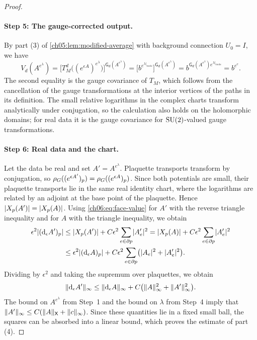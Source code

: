 \begin{proof}
\paragraph{Step 5: The gauge-corrected output.}
By part (3) of \cref{ch05:lem:modified-average} with background connection $U_0=I$, we have
\[
 V_d(A^{e^\lambda})=\bigl[T_M^d\bigl((e^{\epsilon A})^{e^\lambda}\bigr)\bigr]^{\mathsf G_d(A^{e^\lambda})}=\bigl[b^{e^{\lambda|_{\mathrm{roots}}}}\bigr]^{\mathsf G_d(A^{e^\lambda})}=b^{\mathsf G_d(A^{e^\lambda})e^{\lambda|_{\mathrm{roots}}}}=b^{e^c}.
\]
The second equality is the gauge covariance of $T_M$, which follows from the cancellation of the gauge transformations at the interior vertices of the paths in its definition. The small relative logarithms in the complex charts transform analytically under conjugation, so the calculation also holds on the holomorphic domains; for real data it is the gauge covariance for $\mathrm{SU}(2)$-valued gauge transformations.

\paragraph{Step 6: Real data and the chart.}
Let the data be real and set $A'=A^{e^\lambda}$. Plaquette transports transform by conjugation, so $\rho_G((e^{\epsilon A'})_p)=\rho_G((e^{\epsilon A})_p)$. Since both potentials are small, their plaquette transports lie in the same real identity chart, where the logarithms are related by an adjoint at the base point of the plaquette. Hence $\lvert X_p(A')\rvert=\lvert X_p(A)\rvert$. Using \eqref{ch06:eq:face-value} for $A'$ with the reverse triangle inequality and for $A$ with the triangle inequality, we obtain
\begin{equation}\label{ch06:eq:gauge-curl-comparison}
 \begin{split}
 \epsilon^2\lvert (\mathrm d_\epsilon A')_p\rvert&\le\lvert X_p(A')\rvert+C\epsilon^2\sum_{e\in\partial p}\lvert A'_e\rvert^2=\lvert X_p(A)\rvert+C\epsilon^2\sum_{e\in\partial p}\lvert A'_e\rvert^2\\
 &\le\epsilon^2\lvert (\mathrm d_\epsilon A)_p\rvert+C\epsilon^2\sum_{e\in\partial p}\bigl(\lvert A_e\rvert^2+\lvert A'_e\rvert^2\bigr).
 \end{split}
\end{equation}
Dividing by $\epsilon^2$ and taking the supremum over plaquettes, we obtain
\[
 \lVert \mathrm d_\epsilon A'\rVert_\infty\le\lVert \mathrm d_\epsilon A\rVert_\infty+C\bigl(\lVert A\rVert_\infty^2+\lVert A'\rVert_\infty^2\bigr).
\]
The bound on $A^{e^\lambda}$ from Step~1 and the bound on $\lambda$ from Step~4 imply that $\lVert A'\rVert_\infty\le C(\lVert A\rVert_{\mathsf X}+\lVert c\rVert_\infty)$. Since these quantities lie in a fixed small ball, the squares can be absorbed into a linear bound, which proves the estimate of part (4).


\end{proof}
